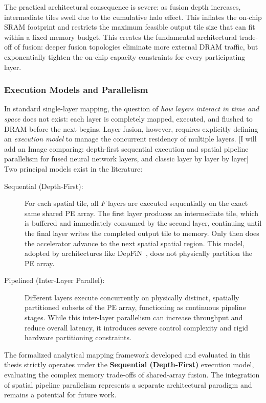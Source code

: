 The practical architectural consequence is severe: as fusion depth increases, intermediate tiles swell due to the cumulative halo effect. This inflates the on-chip SRAM footprint and restricts the maximum feasible output tile size that can fit within a fixed memory budget. This creates the fundamental architectural trade-off of fusion: deeper fusion topologies eliminate more external DRAM traffic, but exponentially tighten the on-chip capacity constraints for every participating layer.

\subsubsection{Execution Models and Parallelism}
\label{sec:fds-sequential}

In standard single-layer mapping, the question of \emph{how layers interact in time and space} does not exist: each layer is completely mapped, executed, and flushed to DRAM before the next begins. Layer fusion, however, requires explicitly defining an \emph{execution model} to manage the concurrent residency of multiple layers. 
[I will add an Image comparing: depth-first sequential execution and spatial pipeline parallelism for fused neural network layers, and classic layer by layer by layer] Two principal models exist in the literature:

\begin{description}
  \item[Sequential (Depth-First):]
    For each spatial tile, all $F$ layers are executed sequentially on the exact same shared PE array. The first layer produces an intermediate tile, which is buffered and immediately consumed by the second layer, continuing until the final layer writes the completed output tile to memory. Only then does the accelerator advance to the next spatial spatial region. This model, adopted by architectures like DepFiN~\cite{goetschalckx2023depfin}, does not physically partition the PE array.    
  \item[Pipelined (Inter-Layer Parallel):]
    Different layers execute concurrently on physically distinct, spatially partitioned subsets of the PE array, functioning as continuous pipeline stages. While this inter-layer parallelism can increase throughput and reduce overall latency, it introduces severe control complexity and rigid hardware partitioning constraints.
\end{description}

The formalized analytical mapping framework developed and evaluated in this thesis strictly operates under the \textbf{Sequential (Depth-First)} execution model, evaluating the complex memory trade-offs of shared-array fusion. The integration of spatial pipeline parallelism represents a separate architectural paradigm and remains a potential for future work.
